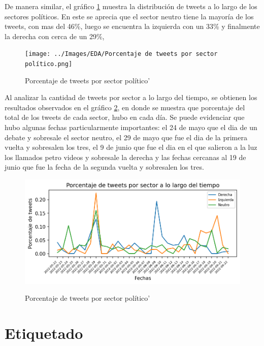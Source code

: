 De manera similar, el gráfico \ref{figure:tweets_porcentaje} muestra la distribución de tweets a lo largo de los sectores políticos. En este se aprecia que el sector neutro tiene la mayoría de los tweets, con mas del 46\%, luego se encuentra la izquierda con un 33\% y finalmente la derecha con cerca de un 29\%,



\begin{figure}[h]
	\caption{Porcentaje de tweets por sector político'}
	\centering
	\texttt{[image: ../Images/EDA/Porcentaje de tweets por sector político.png]} 
	\label{figure:tweets_porcentaje}
\end{figure}


Al analizar la cantidad de tweets por sector a lo largo del tiempo, se obtienen los resultados observados en el gráfico \ref{figure:tweets_porcentaje_tiempo}, en donde se muestra que porcentaje del total de los tweets de cada sector, hubo en cada día. Se puede evidenciar que hubo algunas fechas particularmente importantes: el 24 de mayo que el dia de un debate y sobresale el sector neutro, el 29 de mayo que fue el dia de la primera vuelta y sobresalen los tres, el 9 de junio que fue el dia en el que salieron a la luz los llamados petro videos y sobresale la derecha y las fechas cercanas al 19 de junio que fue la fecha de la segunda vuelta y sobresalen los tres.

\begin{figure}[h]
	\caption{Porcentaje de tweets por sector político'}
	\centering
	\includegraphics{../Images/EDA/Porcentaje de tweets por sector a lo largo del tiempo.png} 
	\label{figure:tweets_porcentaje_tiempo}
\end{figure}


\section{Etiquetado}

